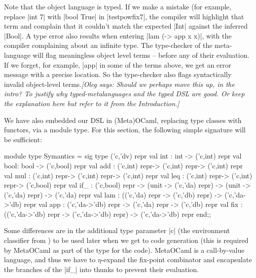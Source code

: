 \documentclass[preprint]{sigplanconf}
\newcommand{\oleg}[1]{{\it [Oleg says: #1]}}
\let\cite=\citep
\begin{document}
Note that the object language is typed. If we make a mistake
(for example, replace |int 7| with |bool True| in |testpowfix7|, the
compiler will highlight that term and complain that it couldn't match
the expected |Int| against the inferred |Bool|. A type error
also results when entering |lam (\x -> app x x)|, with the compiler
complaining about an infinite type. The type-checker of the
meta-language will flag meaningless object level terms --
before any of their evaluation. If we forget, for example, |app| in
some of the terms above, we get an error message with a precise
location. So the type-checker also flags syntactically invalid
object-level terms.\oleg{Should we perhaps move this up, in the
  intro? To justify why typed-metalanguages and the typed DSL are
  good. Or keep the explanation here but refer to it from the Introduction.}

We have also embedded our DSL in (Meta)OCaml, replacing type classes with
functors, via a module type.  For this section, the following simple
signature will be sufficient:

\begin{code}
module type Symantics = sig
  type ('c,'dv) repr
  val int : int  -> ('c,int) repr
  val bool: bool -> ('c,bool) repr
  val add : ('c,int) repr-> ('c,int) repr-> ('c,int) repr
  val mul : ('c,int) repr-> ('c,int) repr-> ('c,int) repr
  val leq : ('c,int) repr-> ('c,int) repr-> ('c,bool) repr
  val if_ : ('c,bool) repr ->
             (unit -> ('c,'da) repr) ->
             (unit -> ('c,'da) repr) -> ('c,'da) repr 
  val lam : (('c,'da) repr -> ('c,'db) repr) 
          -> ('c,'da->'db) repr
  val app : ('c,'da->'db) repr
    -> ('c,'da) repr -> ('c,'db) repr
  val fix : (('c,'da->'db) repr -> ('c,'da->'db) repr) 
            -> ('c,'da->'db) repr
end;;
\end{code}

Some differences are in the additional type parameter |c| (the
environment classifier from \cite{WalidPOPL03}) to be used later when we get to
code generation (this is required by MetaOCaml as part of the type for the
code). MetaOCaml is a call-by-value language, and thus we have to 
$\eta$-expand
the fix-point combinator and encapsulate the branches of the |if_|
into thunks to prevent their evaluation. 
\end{document}
